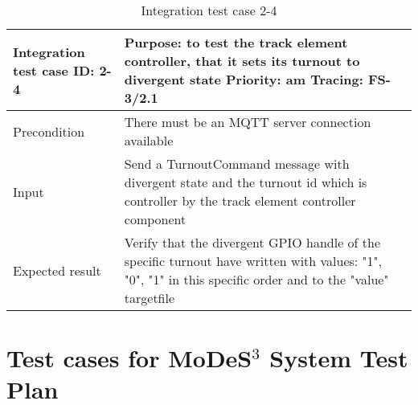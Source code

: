 \begin{table}[H]
	\caption{Integration test case 2-4}
	\label{table:TCase-FSI2-4}
	\begin{center}
		\renewcommand{\arraystretch}{1.8}
		\begin{tabu} 
			to 0.9 \textwidth
			{  X[0.3, l] X[l] }
			\toprule
			Integration test case ID: 2-4 & Purpose: to test the track element controller, that it sets its turnout to divergent state  \newline Priority: am \newline Tracing: FS-3/2.1               \\ \midrule
			Precondition                  & There must be an MQTT server connection available                                                                                                          \\
			Input                         & Send a TurnoutCommand message with divergent state and the turnout id which is controller by the track element controller component                        \\
			Expected result               & Verify that the divergent GPIO handle of the specific turnout have written with values: "1", "0", "1" in this specific order and to the "value" targetfile \\ \bottomrule
		\end{tabu}
	\end{center}
\end{table} 


\section{Test cases for MoDeS$^3$ System Test Plan} \label{appendix:SystemTC}

